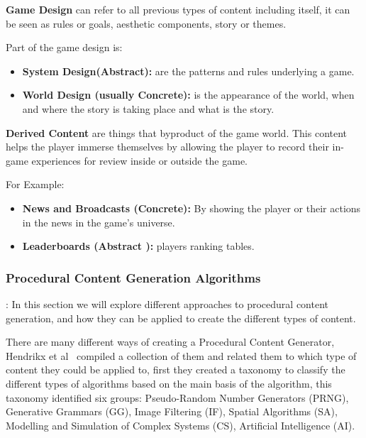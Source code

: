 \documentclass[runningheads]{llncs}
\begin{document}
\textbf{Game Design} can refer to all previous types of content including itself, it can be seen as rules or goals, aesthetic components, story or themes.

Part of the game design is:
\begin{itemize}
    \item\textbf{System Design(Abstract):} are the patterns and rules underlying a game.
    
    \item\textbf{World Design (usually Concrete):} is the appearance of the world, when and where the story is taking place and what is the story.~\cite{ref_brathwaite}
\end{itemize}

\textbf{Derived Content} are things that byproduct of the game world. This content helps the player immerse themselves by allowing the player to record their in-game experiences for review inside or outside the game.

For Example:
\begin{itemize}
    \item\textbf{News and Broadcasts (Concrete):} By showing the player or their actions in the news in the game’s universe.
    
    \item\textbf{Leaderboards (Abstract ):} players ranking tables.
\end{itemize}
\subsubsection{Procedural Content Generation Algorithms}:
In this section we will explore different approaches to procedural content generation, and how they can be applied to create the different types of content.

There are many different ways of creating a Procedural Content Generator, Hendrikx et al~\cite{ref_hendrikx} compiled a collection of them and related them to which type of content they could be applied to, first they created a taxonomy to classify the different types of algorithms based on the main basis of the algorithm, this taxonomy identified six groups: Pseudo-Random Number Generators (PRNG), Generative Grammars (GG), Image Filtering (IF), Spatial Algorithms (SA), Modelling and Simulation of Complex Systems (CS), Artificial Intelligence (AI).

%
%
\end{document}
